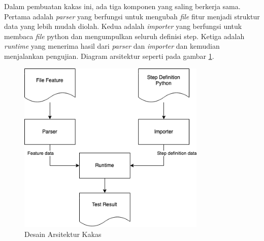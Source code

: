Dalam pembuatan kakas ini, ada tiga komponen yang saling berkerja sama. Pertama adalah \emph{parser} yang
berfungsi untuk mengubah \emph{file} fitur menjadi struktur data yang lebih mudah diolah. Kedua adalah
\emph{importer} yang berfungsi untuk membaca \emph{file} python dan mengumpulkan seluruh definisi step.
Ketiga adalah \emph{runtime} yang menerima hasil dari \emph{parser} dan \emph{importer} dan kemudian
menjalankan pengujian. Diagram arsitektur seperti pada gambar \ref{dia:desain-arsitektur}.

\begin{figure}[h]
  \centering
  \includegraphics[width=0.8\textwidth]{resources/desain-arsitektur.png}
  \caption{Desain Arsitektur Kakas}
  \label{dia:desain-arsitektur}
\end{figure}






